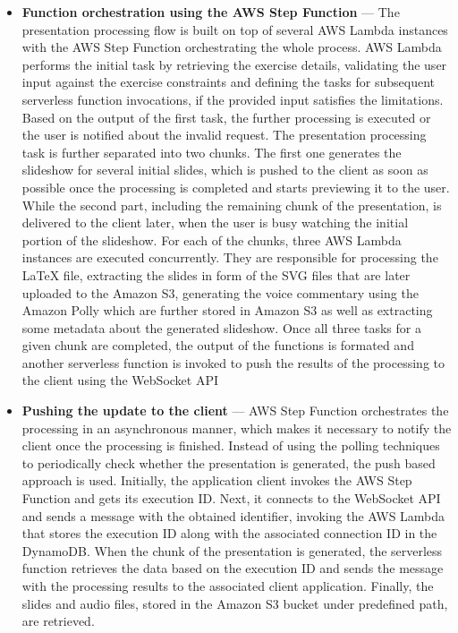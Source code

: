 \begin{itemize}
   \item \textbf{Function orchestration using the AWS Step Function} --- The presentation processing flow is built on top of several AWS Lambda instances with the AWS Step Function orchestrating the whole process.
   AWS Lambda performs the initial task by retrieving the exercise details, validating the user input against the exercise constraints and defining the tasks for subsequent serverless function invocations, if the provided input satisfies the limitations.
   Based on the output of the first task, the further processing is executed or the user is notified about the invalid request.
   The presentation processing task is further separated into two chunks. 
   The first one generates the slideshow for several initial slides, which is pushed to the client as soon as possible once the processing is completed and starts previewing it to the user. While the second part, including the remaining chunk of the presentation, is delivered to the client later, when the user is busy watching the initial portion of the slideshow.
   For each of the chunks, three AWS Lambda instances are executed concurrently. They are responsible for processing the LaTeX file, extracting the slides in form of the SVG files that are later uploaded to the Amazon S3, generating the voice commentary using the Amazon Polly which are further stored in Amazon S3 as well as extracting some metadata about the generated slideshow.
   Once all three tasks for a given chunk are completed, the output of the functions is formated and another serverless function is invoked to push the results of the processing to the client using the WebSocket API
   \item \textbf{Pushing the update to the client} --- AWS Step Function orchestrates the processing in an asynchronous manner, which makes it necessary to notify the client once the processing is finished.
   Instead of using the polling techniques to periodically check whether the presentation is generated, the push based approach is used.
   Initially, the application client invokes the AWS Step Function and gets its execution ID.
   Next, it connects to the WebSocket API and sends a message with the obtained identifier, invoking the AWS Lambda that stores the execution ID along with the associated connection ID in the DynamoDB.
   When the chunk of the presentation is generated, the serverless function retrieves the data based on the execution ID and sends the message with the processing results to the associated client application.
   Finally, the slides and audio files, stored in the Amazon S3 bucket under predefined path, are retrieved.
\end{itemize}

